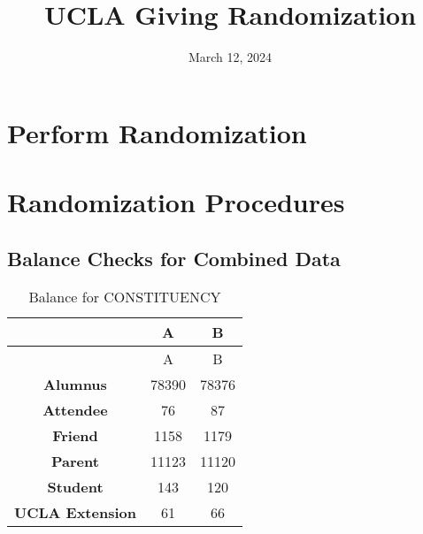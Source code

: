\documentclass[
]{article}
\title{UCLA Giving Randomization}
\author{}
\date{\vspace{-2.5em}March 12, 2024}
\newenvironment{Shaded}{\begin{snugshade}}{\end{snugshade}}
\newcommand{\AttributeTok}[1]{\textcolor[rgb]{0.13,0.29,0.53}{#1}}
\newcommand{\CommentTok}[1]{\textcolor[rgb]{0.56,0.35,0.01}{\textit{#1}}}
\newcommand{\DecValTok}[1]{\textcolor[rgb]{0.00,0.00,0.81}{#1}}
\newcommand{\FloatTok}[1]{\textcolor[rgb]{0.00,0.00,0.81}{#1}}
\newcommand{\FunctionTok}[1]{\textcolor[rgb]{0.13,0.29,0.53}{\textbf{#1}}}
\newcommand{\NormalTok}[1]{#1}
\newcommand{\OtherTok}[1]{\textcolor[rgb]{0.56,0.35,0.01}{#1}}
\newcommand{\SpecialCharTok}[1]{\textcolor[rgb]{0.81,0.36,0.00}{\textbf{#1}}}
\newcommand{\StringTok}[1]{\textcolor[rgb]{0.31,0.60,0.02}{#1}}
\begin{document}
\maketitle

{
\setcounter{tocdepth}{3}
\tableofcontents
}
\section{Perform Randomization}\label{perform-randomization}

\begin{Shaded}
\end{Shaded}

\newpage

\section{Randomization Procedures}\label{randomization-procedures}

\subsection{Balance Checks for Combined
Data}\label{balance-checks-for-combined-data}

\begin{longtable}[]{@{}ccc@{}}
\caption{Balance for CONSTITUENCY}\tabularnewline
\toprule\noalign{}
~ & A & B \\
\midrule\noalign{}
\endfirsthead
\toprule\noalign{}
~ & A & B \\
\midrule\noalign{}
\endhead
\bottomrule\noalign{}
\endlastfoot
\textbf{Alumnus} & 78390 & 78376 \\
\textbf{Attendee} & 76 & 87 \\
\textbf{Friend} & 1158 & 1179 \\
\textbf{Parent} & 11123 & 11120 \\
\textbf{Student} & 143 & 120 \\
\textbf{UCLA Extension} & 61 & 66 \\
\end{longtable}
\end{document}
